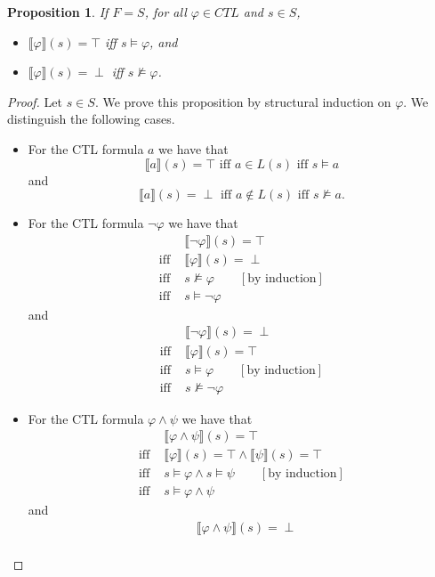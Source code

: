 \documentclass[12pt]{article}
\newtheorem{proposition}{Proposition}
\theoremstyle{definition}
\newcommand{\comment}[1]{\hspace{2em}[\mbox{#1}]}
\newcommand{\satisfaction}[1]{\llbracket #1 \rrbracket}
\begin{document}
\begin{proposition}
If $F = S$, for all $\varphi \in \mathit{CTL}$ and $s \in S$, 
\begin{itemize}
\item
$\satisfaction{\varphi}(s) = \top$ iff $s \models \varphi$, and
\item
$\satisfaction{\varphi}(s) = \perp$ iff $s \not\models \varphi$.
\end{itemize}
\end{proposition}
\begin{proof}
Let $s \in S$.  We prove this proposition by structural induction on $\varphi$.  We distinguish the following cases.
\begin{itemize}
\item 
For the CTL formula $a$ we have that
\[
\satisfaction{a}(s) = \top \mbox{ iff } a \in L(s) \mbox{ iff } s \models a
\]
and
\[
\satisfaction{a}(s) = \perp \mbox{ iff } a \not\in L(s) \mbox{ iff } s \not\models a.
\]
\item
For the CTL formula $\neg \varphi$ we have that
\begin{align*}
& \satisfaction{\neg \varphi}(s) = \top\\
\mbox{iff } & \satisfaction{\varphi}(s) = \perp\\
\mbox{iff } & s \not\models \varphi 
\comment{by induction}\\
\mbox{iff } & s \models \neg \varphi 
\end{align*}
and
\begin{align*}
& \satisfaction{\neg \varphi}(s) = \perp\\
\mbox{iff } & \satisfaction{\varphi}(s) = \top\\
\mbox{iff } & s \models \varphi 
\comment{by induction}\\
\mbox{iff } & s \not\models \neg \varphi 
\end{align*}
\item
For the CTL formula $\varphi \wedge \psi$ we have that
\begin{align*}
& \satisfaction{\varphi \wedge \psi}(s) = \top\\
\mbox{iff } & \satisfaction{\varphi}(s) = \top \wedge \satisfaction{\psi}(s) = \top\\
\mbox{iff } & s \models \varphi \wedge  s \models \psi
\comment{by induction}\\
\mbox{iff } & s \models \varphi \wedge \psi
\end{align*}
and
\begin{align*}
& \satisfaction{\varphi \wedge \psi}(s) = \perp\\

\end{align*}
\end{itemize}
\end{proof}
\end{document}
